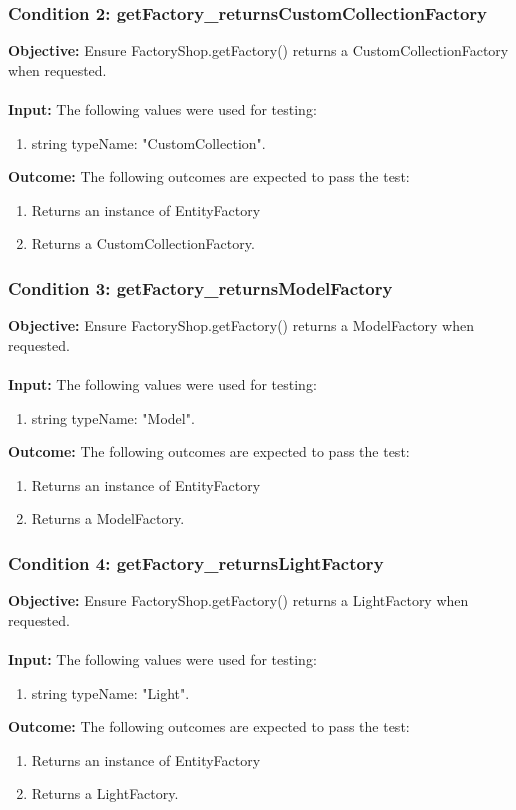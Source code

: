 \documentclass[a4paper,12pt]{article}
\begin{document}
		\subsubsection{Condition 2: getFactory\_returnsCustomCollectionFactory}
			\textbf{Objective:} Ensure FactoryShop.getFactory() returns a CustomCollectionFactory when requested.\\\\
			\textbf{Input:} The following values were used for testing:
				\begin{enumerate}
					\item string typeName: "CustomCollection".
				\end{enumerate}
			\textbf{Outcome:} The following outcomes are expected to pass the test:
				\begin{enumerate}
					\item Returns an instance of EntityFactory
					\item Returns a CustomCollectionFactory.
				\end{enumerate}
		\subsubsection{Condition 3: getFactory\_returnsModelFactory}
			\textbf{Objective:} Ensure FactoryShop.getFactory() returns a ModelFactory when requested.\\\\
			\textbf{Input:} The following values were used for testing:
				\begin{enumerate}
					\item string typeName: "Model".
				\end{enumerate}
			\textbf{Outcome:} The following outcomes are expected to pass the test:
				\begin{enumerate}
					\item Returns an instance of EntityFactory
					\item Returns a ModelFactory.
				\end{enumerate}
		\subsubsection{Condition 4: getFactory\_returnsLightFactory}
			\textbf{Objective:} Ensure FactoryShop.getFactory() returns a LightFactory when requested.\\\\
			\textbf{Input:} The following values were used for testing:
				\begin{enumerate}
					\item string typeName: "Light".
				\end{enumerate}
			\textbf{Outcome:} The following outcomes are expected to pass the test:
				\begin{enumerate}
					\item Returns an instance of EntityFactory
					\item Returns a LightFactory.
				\end{enumerate}
\end{document}
